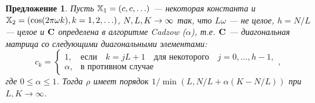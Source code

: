 \documentclass[12pt,a4paper,fleqn,leqno]{article}
\newtheorem{proposition}{Предложение}%
\begin{document}
\begin{proposition}
Пусть $\mathbb{X}_1 = (c, c, \ldots)$ --- некоторая константа и $\mathbb{X}_2 = (\cos(2 \pi \omega k), k = 1, 2, \ldots)$, $N,L,K\rightarrow \infty$ так, что $L\omega$ --- не целое, $h = N/L$ --- целое и $\mathbf{C}$ определена в алгоритме Cadzow ($\alpha$), т.е.  $\mathbf{C}$ --- диагональная матрица со следующими диагональными элементами:
\begin{equation*}
c_k = \begin{cases}
1, & \text{если} \quad k = jL+1 \quad \text{для некоторого} \quad j = 0, \ldots, h-1, \\
\alpha, & \text{в противном случае}
\end{cases},
\end{equation*}
где $0 \le \alpha \le 1$. Тогда $\rho$ имеет порядок $1/\min(L, N/L+\alpha(K - N/L))$ при $L, K \to \infty$.
\end{proposition}
\end{document}
